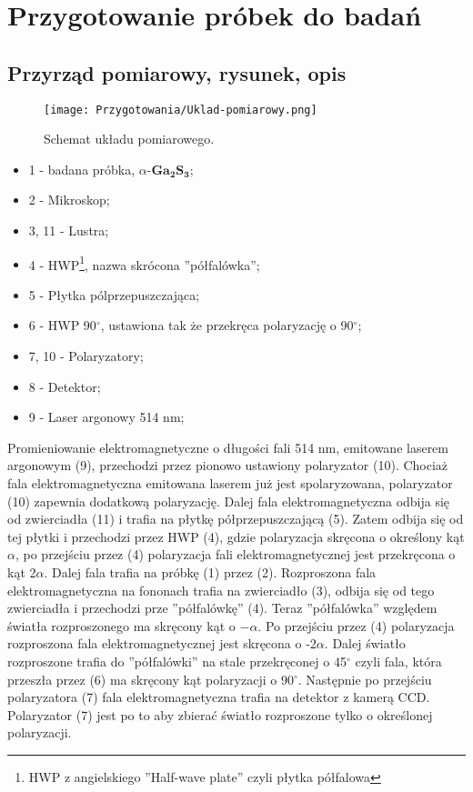 \newpage

\section{Przygotowanie próbek do badań}

\subsection{Przyrząd pomiarowy, rysunek, opis}
\begin{figure}[H]
	\begin{center}
		\texttt{[image: Przygotowania/Uklad-pomiarowy.png]}
		\caption{Schemat układu pomiarowego.}
	\end{center}
\end{figure}

\begin{itemize}
	\item 1 - badana próbka, $\alpha$-$\mathbf{Ga_{2}S_{3}}$;
	\item 2 - Mikroskop;
	\item 3, 11 - Lustra;
	\item 4 - HWP\footnote{HWP z angielskiego ''Half-wave plate'' czyli  płytka półfalowa}, nazwa skrócona ''półfalówka'';
	\item 5 - Płytka pólprzepuszczająca;
	\item 6 - HWP 90$^{\circ}$, ustawiona tak że przekręca polaryzację o 90$^{\circ}$;
	\item 7, 10 - Polaryzatory;
	\item 8 - Detektor;
	\item 9 - Laser argonowy 514 nm;
\end{itemize}

Promieniowanie elektromagnetyczne o długości fali 514 nm, emitowane laserem argonowym (9), przechodzi przez pionowo ustawiony polaryzator (10). Chociaż fala elektromagnetyczna emitowana laserem już jest spolaryzowana, polaryzator (10) zapewnia dodatkową polaryzację. Dalej fala elektromagnetyczna odbija się od zwierciadła (11) i trafia na płytkę półprzepuszczającą (5). Zatem odbija się od tej płytki i przechodzi przez HWP (4), gdzie polaryzacja skręcona o określony kąt $\alpha$, po przejściu przez (4) polaryzacja fali elektromagnetycznej jest przekręcona o kąt 2$\alpha$. Dalej fala trafia na próbkę (1) przez (2). Rozproszona fala elektromagnetyczna na fononach trafia na zwierciadło (3), odbija się od tego zwierciadła i przechodzi prze ''półfalówkę'' (4). Teraz ''półfalówka'' względem światła rozproszonego ma skręcony kąt o $-\alpha$. Po przejściu przez (4) polaryzacja rozproszona fala elektromagnetycznej jest skręcona o -2$\alpha$. Dalej światło rozproszone trafia do ''półfalówki'' na stale przekręconej o 45$^\circ$ czyli fala, która przeszła przez (6) ma skręcony kąt polaryzacji o 90$^\circ$. Następnie po przejściu polaryzatora (7) fala elektromagnetyczna trafia na detektor z kamerą CCD. Polaryzator (7) jest po to aby zbierać światło rozproszone tylko o określonej polaryzacji.

